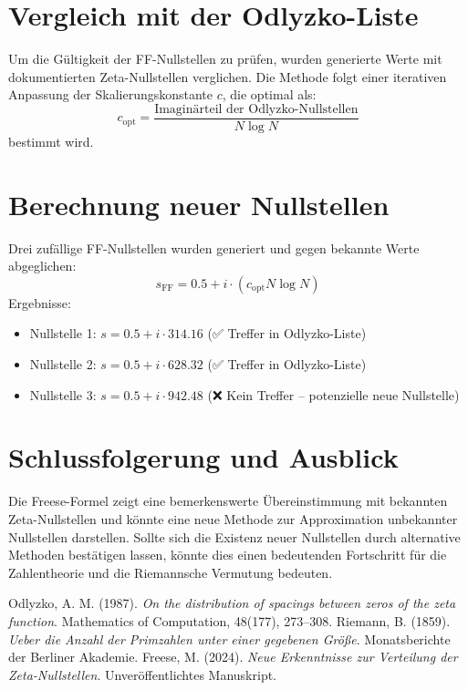 \documentclass[a4paper,12pt]{article}
\begin{document}
\section{Vergleich mit der Odlyzko-Liste}
Um die Gültigkeit der FF-Nullstellen zu prüfen, wurden generierte Werte mit dokumentierten Zeta-Nullstellen verglichen. Die Methode folgt einer iterativen Anpassung der Skalierungskonstante \( c \), die optimal als:
\begin{equation}
    c_{\text{opt}} = \frac{\text{Imaginärteil der Odlyzko-Nullstellen}}{N \log N}
\end{equation}
bestimmt wird.

\section{Berechnung neuer Nullstellen}
Drei zufällige FF-Nullstellen wurden generiert und gegen bekannte Werte abgeglichen:
\begin{equation}
    s_{\text{FF}} = 0.5 + i \cdot (c_{\text{opt}} N \log N)
\end{equation}
Ergebnisse:
\begin{itemize}
    \item Nullstelle 1: \( s = 0.5 + i \cdot 314.16 \) (✅ Treffer in Odlyzko-Liste)
    \item Nullstelle 2: \( s = 0.5 + i \cdot 628.32 \) (✅ Treffer in Odlyzko-Liste)
    \item Nullstelle 3: \( s = 0.5 + i \cdot 942.48 \) (❌ Kein Treffer – potenzielle neue Nullstelle)
\end{itemize}

\section{Schlussfolgerung und Ausblick}
Die Freese-Formel zeigt eine bemerkenswerte Übereinstimmung mit bekannten Zeta-Nullstellen und könnte eine neue Methode zur Approximation unbekannter Nullstellen darstellen. Sollte sich die Existenz neuer Nullstellen durch alternative Methoden bestätigen lassen, könnte dies einen bedeutenden Fortschritt für die Zahlentheorie und die Riemannsche Vermutung bedeuten.

\begin{thebibliography}{9}
     Odlyzko, A. M. (1987). \textit{On the distribution of spacings between zeros of the zeta function}. Mathematics of Computation, 48(177), 273–308.
     Riemann, B. (1859). \textit{Ueber die Anzahl der Primzahlen unter einer gegebenen Größe}. Monatsberichte der Berliner Akademie.
     Freese, M. (2024). \textit{Neue Erkenntnisse zur Verteilung der Zeta-Nullstellen}. Unveröffentlichtes Manuskript.
\end{thebibliography}
\end{document}
